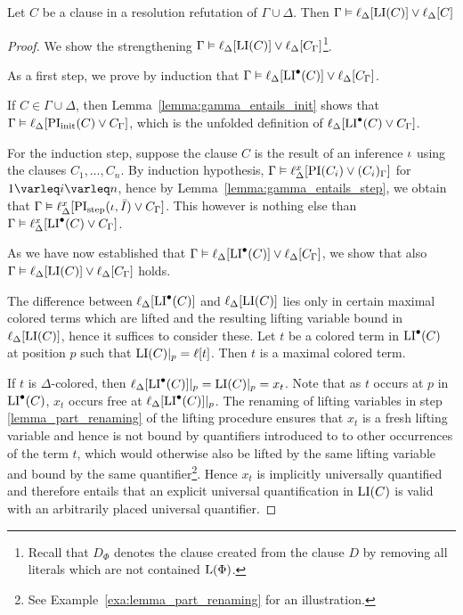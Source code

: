 \begin{lemma}
	\label{lemma:gamma_entails_delta_lifted_invariant}
	Let $C$ be a clause in a resolution refutation of $\Gamma \cup \Delta$.
	Then
	$\Gamma \vDash \ell_{\Delta}[ \operatorname{LI}(C) ] \lor \ell_{\Delta}[C] $
\end{lemma}
\begin{proof}
	We show the strengthening
	$\Gamma \vDash \ell_{\Delta}[ \operatorname{LI}(C) ] \lor \ell_{\Delta}[C_\Gamma]$\footnote{Recall that $D_\Phi$ denotes the clause created from the clause $D$ by removing all literals which are not contained $\operatorname{L}(\Phi)$.}.

	As a first step, 
	we prove by induction that
	$\Gamma \vDash \ell_{\Delta}[ \operatorname{LI}^\bullet(C) ] \lor \ell_{\Delta}[C_\Gamma]$.

	If $C\in \Gamma\cup\Delta$, then Lemma~\ref{lemma:gamma_entails_init} shows that $\Gamma \vDash \ell_{\Delta}[\operatorname{PI}_{\mathrm{init}}(C) \lor C_\Gamma]$, which is the unfolded definition of $\ell_{\Delta}[\operatorname{LI}^\bullet(C) \lor C_\Gamma]$.

	For the induction step, suppose the clause $C$ is the result of an inference $\iota$ using the clauses $C_1, \dots, C_n$.
	By induction hypothesis, $\Gamma \entails \lifdelta{\PI(C_i) \lor\nolinebreak (C_i)_\Gamma}$ for $1\varleq i\varleq n$, hence
	by Lemma~\ref{lemma:gamma_entails_step}, we obtain that 
	$\Gamma \vDash \ell_{\Delta}^{x}[\operatorname{PI}_{\mathrm{step}}(\iota, \bar I) \lor C_\Gamma]$.
	This however is nothing else than $\Gamma \vDash \ell_{\Delta}^{x}[\operatorname{LI}^\bullet(C) \lor C_\Gamma]$.


	As we have now established that
	$\Gamma \vDash \ell_{\Delta}[ \operatorname{LI}^\bullet(C) ] \lor \ell_{\Delta}[C_\Gamma]$,
	we show that also
	$\Gamma \vDash \ell_{\Delta}[ \operatorname{LI}(C) ] \lor \ell_{\Delta}[C_\Gamma]$ holds.


	The difference between $\ell_{\Delta}[\operatorname{LI}^\bullet(C)]$ and $\ell_{\Delta}[\operatorname{LI}(C)]$ lies only in certain maximal colored terms which are lifted and the resulting lifting variable bound in $\ell_{\Delta}[\operatorname{LI}(C)]$, hence it suffices to consider these.
	Let $t$ be a colored term in $\operatorname{LI}^\bullet(C)$ at position $p$ such that $\operatorname{LI}(C)|_{p} = \ell[t]$.
	Then $t$ is a maximal colored term. %

	If $t$ is $\Delta$-colored, then $\ell_{\Delta}[\operatorname{LI}^\bullet(C)]|_{p} = \operatorname{LI}(C)|_{p} = x_t$.
	Note that as $t$ occurs at $p$ in $\operatorname{LI}^\bullet(C)$, $x_t$ occurs free at $\ell_{\Delta}[\operatorname{LI}^\bullet(C)]|_{p}$.
	The renaming of lifting variables in step \ref{lemma_part_renaming} of the lifting procedure
	ensures that $x_t$ is a fresh lifting variable and hence is not bound by quantifiers introduced to to other occurrences of the term $t$, which would otherwise also be lifted by the same lifting variable and bound by the same quantifier\footnote{See Example~\ref{exa:lemma_part_renaming} for an illustration.}.
	Hence $x_t$ is implicitly universally quantified and therefore entails that an explicit universal quantification in $\operatorname{LI}(C)$ is valid with an arbitrarily placed universal quantifier. 


\end{proof}

